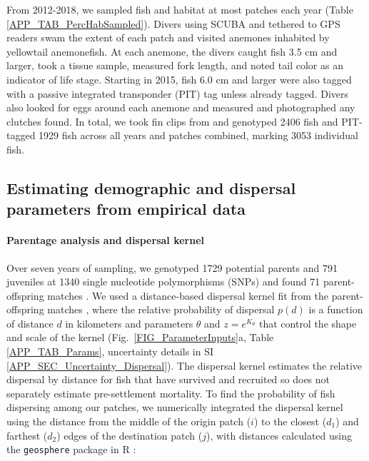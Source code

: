 \documentclass[12pt, oneside]{article}   	%
\begin{document}
From 2012-2018, we sampled fish and habitat at most patches each year (Table \ref{APP_TAB_PercHabSampled}). Divers using SCUBA and tethered to GPS readers swam the extent of each patch and visited anemones inhabited by yellowtail anemonefish. At each anemone, the divers caught fish 3.5 cm and larger, took a tissue sample, measured fork length, and noted tail color as an indicator of life stage. Starting in 2015, fish 6.0 cm and larger were also tagged with a passive integrated transponder (PIT) tag unless already tagged. Divers also looked for eggs around each anemone and measured and photographed any clutches found. In total, we took fin clips from and genotyped 2406 fish and PIT-tagged 1929 fish across all years and patches combined, marking 3053 individual fish. %

\subsection*{Estimating demographic and dispersal parameters from empirical data} 

\paragraph*{Parentage analysis and dispersal kernel}  %

Over seven years of sampling, we genotyped 1729 potential parents and 791 juveniles at 1340 single nucleotide polymorphisms (SNPs) and found 71 parent-offspring matches \citep{catalanoInPrepconnectivity}. We used a distance-based dispersal kernel fit from the parent-offspring matches \citep{catalanoInPrepconnectivity, bode2018estimating}, where the relative probability of dispersal $p(d)$ is a function of distance $d$ in kilometers and parameters $\theta$ and $z = e^{K_d}$ that control the shape and scale of the kernel (Fig.\ \ref{FIG_ParameterInputs}a, Table \ref{APP_TAB_Params}, uncertainty details in SI \ref{APP_SEC_Uncertainty_Dispersal}). The dispersal kernel estimates the relative dispersal by distance for fish that have survived and recruited so does not separately estimate pre-settlement mortality. To find the probability of fish dispersing among our patches, we numerically integrated the dispersal kernel using the distance from the middle of the origin patch ($i$) to the closest ($d_1$) and farthest ($d_2$) edges of the destination patch ($j$), with distances calculated using the \texttt{geosphere} package in R \citep{geosphere2017R}:
\end{document}
